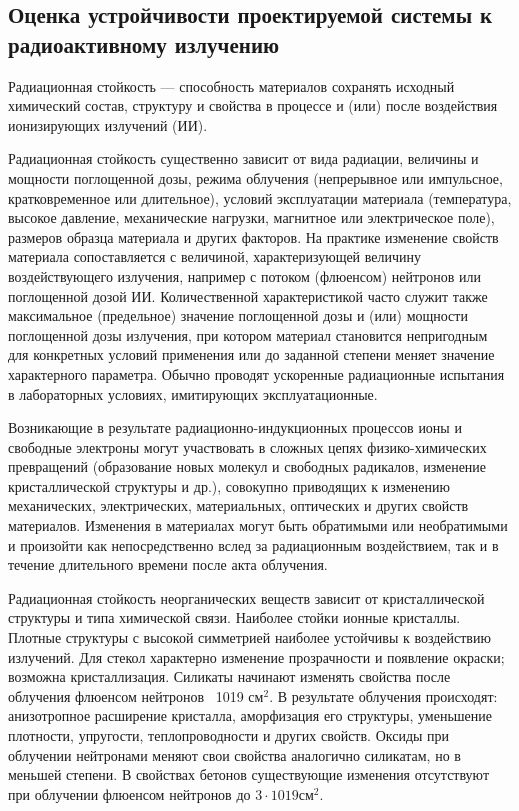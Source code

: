 \subsection{Оценка устройчивости проектируемой системы к радиоактивному излучению}

Радиационная стойкость --- способность материалов сохранять исходный химический состав, структуру и свойства в процессе и (или) после воздействия ионизирующих излучений (ИИ).

Радиационная стойкость существенно зависит от вида радиации, величины и мощности поглощенной дозы, режима облучения (непрерывное или импульсное, кратковременное или длительное), условий эксплуатации материала (температура, высокое давление, механические нагрузки, магнитное или электрическое поле), размеров образца материала и других факторов. На практике изменение свойств материала сопоставляется с величиной, характеризующей величину воздействующего излучения, например с потоком (флюенсом) нейтронов или поглощенной дозой ИИ. Количественной характеристикой часто служит также максимальное (предельное) значение поглощенной дозы и (или) мощности поглощенной дозы излучения, при котором материал становится непригодным для конкретных условий применения или до заданной степени меняет значение характерного параметра. Обычно проводят ускоренные радиационные испытания в лабораторных условиях, имитирующих эксплуатационные.

Возникающие в результате радиационно-индукционных процессов ионы и свободные электроны могут участвовать в сложных цепях физико-химических превращений (образование новых молекул и свободных радикалов, изменение кристаллической структуры и др.), совокупно приводящих к изменению механических, электрических, материальных, оптических и других свойств материалов. Изменения в материалах могут быть обратимыми или необратимыми и произойти как непосредственно вслед за радиационным воздействием, так и в течение длительного времени после акта облучения.

Радиационная стойкость неорганических веществ зависит от кристаллической структуры и типа химической связи. Наиболее стойки ионные кристаллы. Плотные структуры с высокой симметрией наиболее устойчивы к воздействию излучений. Для стекол характерно изменение прозрачности и появление окраски; возможна кристаллизация. Силикаты начинают изменять свойства после облучения флюенсом нейтронов ~1019 $\textrm{см}^2$. В результате облучения происходят: анизотропное расширение кристалла, аморфизация его структуры, уменьшение плотности, упругости, теплопроводности и других свойств. Оксиды при облучении нейтронами меняют свои свойства аналогично силикатам, но в меньшей степени. В свойствах бетонов существующие изменения отсутствуют при облучении флюенсом нейтронов до $3 \cdot 1019 \textrm{см}^2$.

